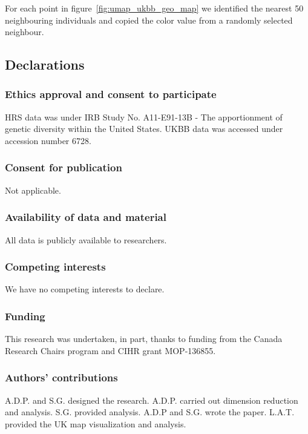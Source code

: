 \documentclass[12pt]{pnas-new}
\begin{document}
{For each point in figure~\ref{fig:umap_ukbb_geo_map} we identified the nearest 50 neighbouring individuals and copied the color value from a randomly selected neighbour.}

\showmatmethods{} %



\subsection*{Declarations}
\subsubsection*{Ethics approval and consent to participate}
HRS data was under IRB Study No. A11-E91-13B - The apportionment of genetic diversity within the United States. UKBB data was accessed under accession number 6728.

\subsubsection*{Consent for publication} Not applicable.

\subsubsection*{Availability of data and material} All data is publicly available to researchers.

\subsubsection*{Competing interests}
We have no competing interests to declare.

\subsubsection*{Funding}
This research was undertaken, in part, thanks to funding from the Canada Research Chairs program and CIHR grant MOP-136855.

\subsubsection*{Authors' contributions}
A.D.P. and S.G. designed the research. A.D.P. carried out dimension reduction and analysis. S.G. provided analysis. A.D.P and S.G. wrote the paper. L.A.T. provided the UK map visualization and analysis.
\end{document}
